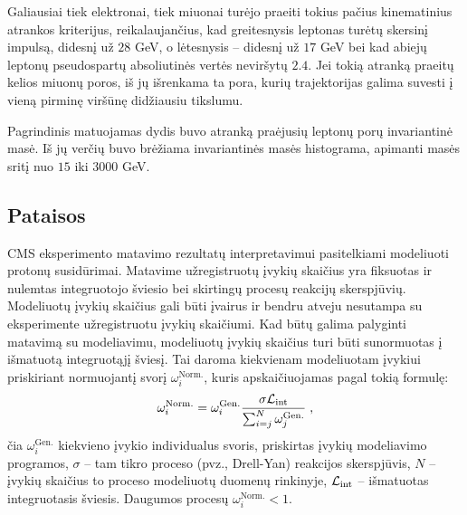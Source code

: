\documentclass[a4paper, 12pt, twoside]{article}
\newcommand{\Lumi}{{\cal L}_\mathrm{int}}
\newlength\q
\begin{document}
Galiausiai tiek elektronai, tiek miuonai turėjo praeiti tokius pačius kinematinius atrankos kriterijus,
reikalaujančius, kad greitesnysis leptonas turėtų skersinį impulsą, didesnį už $28$ GeV, o lėtesnysis --
didesnį už $17$ GeV bei kad abiejų leptonų pseudospartų absoliutinės vertės neviršytų $2.4$.
Jei tokią atranką praeitų kelios miuonų poros, iš jų išrenkama ta pora, kurių trajektorijas galima suvesti į
vieną pirminę viršūnę didžiausiu tikslumu.

Pagrindinis matuojamas dydis buvo atranką praėjusių leptonų porų invariantinė masė.
Iš jų verčių buvo brėžiama invariantinės masės histograma, apimanti masės sritį nuo $15$ iki $3000$ GeV.


\subsection{Pataisos}\label{sec:corrections}
CMS eksperimento matavimo rezultatų interpretavimui pasitelkiami modeliuoti protonų susidūrimai.
Matavime užregistruotų įvykių skaičius yra fiksuotas ir nulemtas integruotojo šviesio bei skirtingų
procesų reakcijų skerspjūvių.
Modeliuotų įvykių skaičius gali būti įvairus ir bendru atveju nesutampa su eksperimente užregistruotu
įvykių skaičiumi.
Kad būtų galima palyginti matavimą su modeliavimu, modeliuotų įvykių skaičius turi būti sunormuotas
į išmatuotą integruotąjį šviesį.
Tai daroma kiekvienam modeliuotam įvykiui priskiriant normuojantį svorį $\omega_{i}^{\mathrm{Norm.}}$,
kuris apskaičiuojamas pagal tokią formulę:
\begin{equation}
	\omega_{i}^{\mathrm{Norm.}} = \omega_{i}^{\mathrm{Gen.}} \frac{ \sigma\Lumi }{ \sum_{i=j}^{N}\omega_{j}^{\mathrm{Gen.}} } \; ,
	\label{eq:NLOweight}
\end{equation}
čia $\omega_{i}^{\mathrm{Gen.}}$ kiekvieno įvykio individualus svoris, priskirtas įvykių modeliavimo programos,
$\sigma$ -- tam tikro proceso (pvz., Drell-Yan) reakcijos skerspjūvis, $N$ -- įvykių skaičius to
proceso modeliuotų duomenų rinkinyje, $\Lumi$ -- išmatuotas integruotasis šviesis.
Daugumos procesų $\omega_{i}^{\mathrm{Norm.}}<1$.
\end{document}
